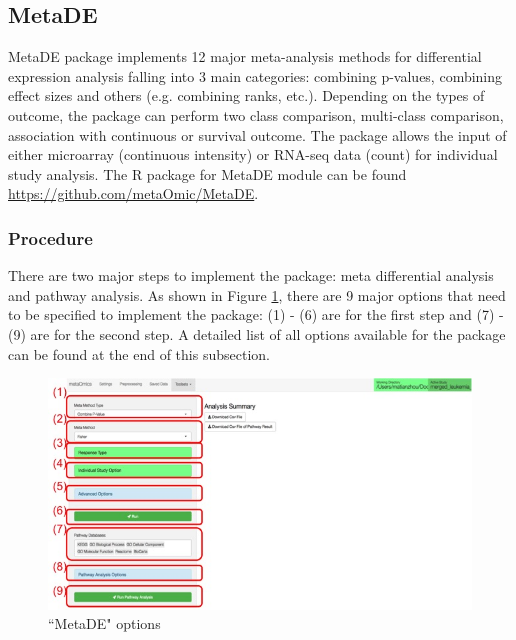 \subsection{MetaDE}

MetaDE package implements 12 major meta-analysis methods for differential expression analysis falling into 3 main categories: combining p-values, combining effect sizes and others (e.g. combining ranks, etc.). Depending on the types of outcome, the package can perform two class comparison, multi-class comparison, association with continuous or survival outcome. The package allows the input of either microarray (continuous intensity) or RNA-seq data (count) for individual study analysis. 
The R package for MetaDE module can be found \url{https://github.com/metaOmic/MetaDE}.

\subsubsection{Procedure}

There are two major steps to implement the package: meta differential analysis and pathway analysis. As shown in Figure \ref{fig:MetaDEoption}, there are 9 major options that need to be specified to implement the package: (1) - (6) are for the first step and (7) - (9) are for the second step. A detailed list of all options available for the package can be found at the end of this subsection. 

\begin{figure}[H]
\begin{center}
\includegraphics[scale=0.45]{./figure/metaDE/metaDEoption.jpg}
\caption{``MetaDE" options}
\label{fig:MetaDEoption}
\end{center}
\end{figure}


